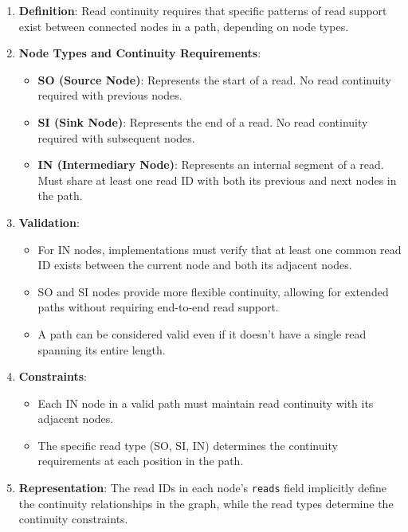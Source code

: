 \documentclass[11pt,a4paper]{article}
\begin{document}
\begin{enumerate}[leftmargin=*]
	\item \textbf{Definition}: Read continuity requires that specific patterns of read support exist between connected nodes in a path, depending on node types.

	\item \textbf{Node Types and Continuity Requirements}:
	      \begin{itemize}
		      \item \textbf{SO (Source Node)}: Represents the start of a read. No read continuity required with previous nodes.
		      \item \textbf{SI (Sink Node)}: Represents the end of a read. No read continuity required with subsequent nodes.
		      \item \textbf{IN (Intermediary Node)}: Represents an internal segment of a read. Must share at least one read ID with both its previous and next nodes in the path.
	      \end{itemize}

	\item \textbf{Validation}:
	      \begin{itemize}
		      \item For IN nodes, implementations must verify that at least one common read ID exists between the current node and both its adjacent nodes.
		      \item SO and SI nodes provide more flexible continuity, allowing for extended paths without requiring end-to-end read support.
		      \item A path can be considered valid even if it doesn't have a single read spanning its entire length.
	      \end{itemize}

	\item \textbf{Constraints}:
	      \begin{itemize}
		      \item Each IN node in a valid path must maintain read continuity with its adjacent nodes.
		      \item The specific read type (SO, SI, IN) determines the continuity requirements at each position in the path.
	      \end{itemize}

	\item \textbf{Representation}: The read IDs in each node's \texttt{reads} field implicitly define the continuity relationships in the graph, while the read types determine the continuity constraints.
\end{enumerate}
\end{document}
